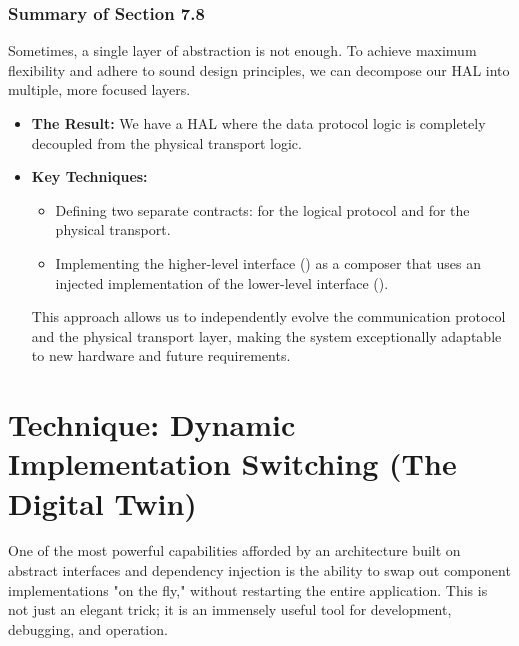 \subsubsection{Summary of Section 7.8}
\label{subsubsec:section7_8_summary}
Sometimes, a single layer of abstraction is not enough. To achieve maximum flexibility and adhere to sound design principles, we can decompose our HAL into multiple, more focused layers.
\begin{itemize}
    \item \textbf{The Result:} We have a HAL where the data protocol logic is completely decoupled from the physical transport logic.
    \item \textbf{Key Techniques:}
    \begin{itemize}
        \item Defining two separate contracts:  for the logical protocol and  for the physical transport.
        \item Implementing the higher-level interface () as a composer that uses an injected implementation of the lower-level interface ().
    \end{itemize}
    This approach allows us to independently evolve the communication protocol and the physical transport layer, making the system exceptionally adaptable to new hardware and future requirements.
\end{itemize}












\section{Technique: Dynamic Implementation Switching (The Digital Twin)}
\label{sec:technique_dynamic_switching}

One of the most powerful capabilities afforded by an architecture built on abstract interfaces and dependency injection is the ability to swap out component implementations "on the fly," without restarting the entire application. This is not just an elegant trick; it is an immensely useful tool for development, debugging, and operation.

